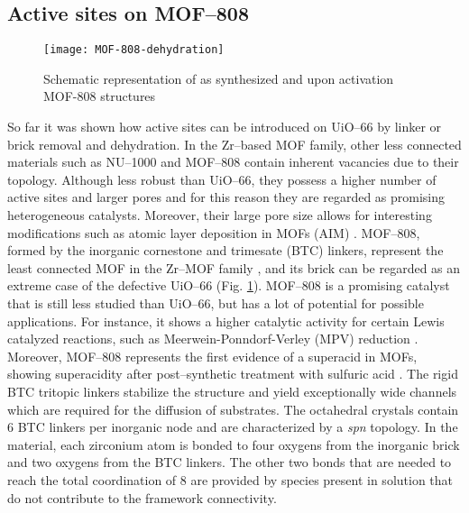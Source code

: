 \subsection*{Active sites on MOF--808}
\begin{figure}[!htbp]
	\centering
	\texttt{[image: MOF-808-dehydration]}
	\caption{Schematic representation of as synthesized and upon activation MOF-808 structures}
	\label{fig:MOF-808-dehydration}
\end{figure}
So far it was shown how active sites can be introduced on UiO--66 by linker or brick removal and dehydration. In the Zr--based MOF family, other less connected materials such as NU--1000 and MOF--808 contain inherent vacancies due to their topology. Although less robust than UiO--66, they possess a higher number of active sites and larger pores and for this reason they are regarded as promising heterogeneous catalysts. Moreover, their large pore size allows for interesting modifications such as atomic layer deposition in MOFs (AIM) \cite{mondloch2013vapor}.
MOF--808, formed by the inorganic  cornestone and trimesate (BTC) linkers, represent the least connected MOF in the Zr--MOF family \cite{furukawa2014water}, and its brick can be regarded as an extreme case of the defective UiO--66 (Fig. \ref{fig:MOF-808-dehydration}). 
MOF--808 is a promising catalyst that is still less studied than UiO--66, but has a lot of potential for possible applications. For instance, it shows a higher catalytic activity for certain Lewis catalyzed reactions, such as Meerwein-Ponndorf-Verley (MPV) reduction \cite{plessers2016zr, mautschke2018catalytic}. Moreover, MOF--808 represents the first evidence of a superacid in MOFs, showing superacidity after post--synthetic treatment with sulfuric acid \cite{jiang2014superacidity}.
\npar
The rigid BTC tritopic linkers stabilize the structure and yield exceptionally wide channels which are required for the diffusion of substrates. The octahedral crystals contain 6 BTC linkers per inorganic node and are characterized by a \textit{spn} topology. 
In the material, each zirconium atom is bonded to four oxygens from the inorganic brick and two oxygens from the BTC linkers. The other two bonds that are needed to reach the total coordination of 8 are provided by species present in solution that do not contribute to the framework connectivity. 
\npar
